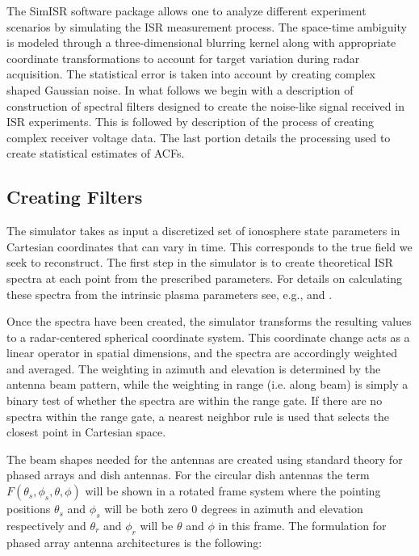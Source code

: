 \documentclass[draft,ras]{agutex}
\begin{document}
\begin{article}
The SimISR software package allows one to analyze different  experiment scenarios by simulating the ISR measurement process. The space-time ambiguity is modeled through a three-dimensional blurring kernel along with appropriate coordinate transformations to account for target variation during radar acquisition.   The statistical error is taken into account by creating complex shaped Gaussian noise. In what follows we begin with a description of construction of spectral filters designed to create the noise-like signal received in ISR experiments. This is followed by description of the process of creating complex receiver voltage data. The last portion details the processing used to create statistical estimates of ACFs.

\subsection{Creating Filters}

The simulator takes as input a discretized set of ionosphere state parameters in Cartesian coordinates that can vary in time.  This corresponds to the true field we seek to reconstruct. The first step in the simulator is to create theoretical ISR spectra at each point from the prescribed parameters. For details on calculating these spectra from the intrinsic plasma parameters see, e.g., \citet{kudeki:milla:1} and \citet{kudeki:milla:2}. 

Once the spectra have been created, the simulator transforms the resulting values to a radar-centered spherical coordinate system. This coordinate change acts as a linear operator in spatial dimensions, and the spectra are accordingly weighted and averaged. The weighting in azimuth and elevation is determined by the antenna beam pattern, while the weighting in range (i.e. along beam) is simply a binary test of whether the spectra are within the range gate. If there are no spectra within the range gate, a nearest neighbor rule is used that selects the closest point in Cartesian space. 

The beam shapes needed for the antennas are created using standard theory for phased arrays and dish antennas. For the circular dish antennas the term $F(\theta_s,\phi_s,\theta,\phi)$ will be shown in a rotated frame system where the pointing positions $\theta_s$ and $\phi_s$ will be both zero 0 degrees in azimuth and elevation respectively and $\theta_r$ and $\phi_r$ will be $\theta$ and $\phi$ in this frame. The formulation for phased array antenna architectures is the following:


\end{article}
\end{document}
